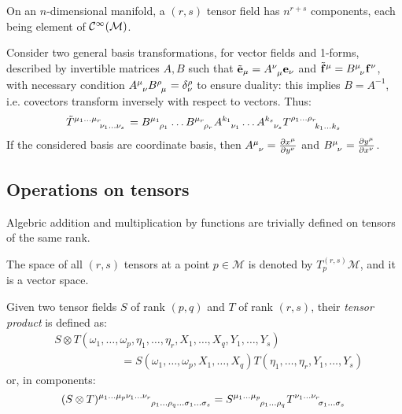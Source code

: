\begin{proposition}
  On an $ n $-dimensional manifold, a $ (r,s) $ tensor field has $ n^{r+s} $ components, each being element of $ \mathcal{C}^{\infty}(\mathcal{M}) $.
\end{proposition}

Consider two general basis transformations, for vector fields and 1-forms, described by invertible matrices $ A,B $ such that $ \tilde{\ve{e}}_{\mu} = \tensor{A}{^\nu_\mu}\ve{e}_{\nu} $ and $ \tilde{\ve{f}}^{\mu} = \tensor{B}{^\mu_\nu}\ve{f}^{\nu} $, with necessary condition $ \tensor{A}{^\mu_\nu} \tensor{B}{^\rho_\mu} = \delta^{\rho}_{\nu} $ to ensure duality: this implies $ B = A^{-1} $, i.e. covectors transform inversely with respect to vectors. Thus:
\begin{equation}
  \tensor{\tilde{T}}{^{\mu_1}^{\dots}^{\mu_r}_{\nu_1}_{\dots}_{\nu_s}} = \tensor{B}{^{\mu_1}_{\rho_1}} \dots \tensor{B}{^{\mu_r}_{\rho_r}} \tensor{A}{^{k_1}_{\nu_1}} \dots \tensor{A}{^{k_s}_{\nu_s}} \tensor{T}{^{\rho_1}^{\dots}^{\rho_r}_{k_1}_{\dots}_{k_s}}
  \label{eq:2.26}
\end{equation}
If the considered basis are coordinate basis, then $ \tensor{A}{^\mu_\nu} = \frac{\pa x^{\mu}}{\pa y^{\nu}} $ and $ \tensor{B}{^\mu_\nu} = \frac{\pa y^{\mu}}{\pa x^{\nu}} $.

\subsection{Operations on tensors}

Algebric addition and multiplication by functions are trivially defined on tensors of the same rank.

\begin{proposition}
  The space of all $ (r,s) $ tensors at a point $ p \in \mathcal{M} $ is denoted by $ T_p^{(r,s)}\mathcal{M} $, and it is a vector space.
\end{proposition}

\begin{definition}
  Given two tensor fields $ S $ of rank $ (p,q) $ and $ T $ of rank $ (r,s) $, their \textit{tensor product} is defined as:
  \begin{equation}
    \begin{split}
      &S \otimes T (\omega_1,\dots,\omega_p,\eta_1,\dots,\eta_r,X_1,\dots,X_q,Y_1,\dots,Y_s)\\
      &\qquad\qquad\qquad = S(\omega_1,\dots,\omega_p,X_1,\dots,X_q) T(\eta_1,\dots,\eta_r,Y_1,\dots,Y_s)
    \end{split}
    \label{eq:2.27}
  \end{equation}
  or, in components:
  \begin{equation}
    \tensor{(S \otimes T)}{^{\mu_1}^{\dots}^{\mu_p}^{\nu_1}^{\dots}^{\nu_r}_{\rho_1}_{\dots}_{\rho_q}_{\dots}_{\sigma_1}_{\dots}_{\sigma_s}} = \tensor{S}{^{\mu_1}^{\dots}^{\mu_p}_{\rho_1}_{\dots}_{\rho_q}} \tensor{T}{^{\nu_1}^{\dots}^{\nu_r}_{\sigma_1}_{\dots}_{\sigma_s}}
    \label{eq:2.28}
  \end{equation}
\end{definition}

